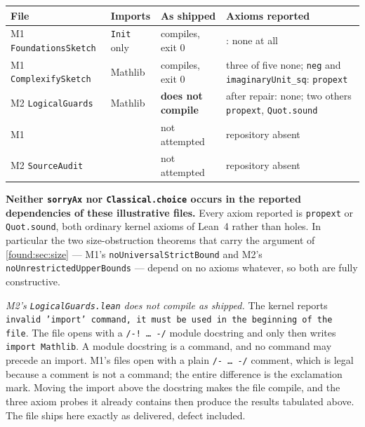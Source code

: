 \documentclass[11pt,letterpaper]{article}
\numberwithin{equation}{section}
\theoremstyle{definition}
\theoremstyle{remark}
\begin{document}
\begin{center}\small
\begin{tabular}{@{}P{0.29\textwidth}P{0.17\textwidth}P{0.20\textwidth}P{0.26\textwidth}@{}}
\toprule
\textbf{File} & \textbf{Imports} & \textbf{As shipped} & \textbf{Axioms reported}\\
\midrule
M1 \texttt{FoundationsSketch} & \texttt{Init} only & compiles, exit 0 &
  : none at all\\[0.35em]
M1 \texttt{ComplexifySketch} & Mathlib & compiles, exit 0 &
  three of five none; \texttt{neg} and \texttt{imaginaryUnit\_sq}:
  \texttt{propext}\\[0.35em]
M2 \texttt{LogicalGuards} & Mathlib & \textbf{does not compile} &
  after repair:  none; two others
  \texttt{propext}, \texttt{Quot.sound}\\[0.35em]
M1  &  & not attempted &
  repository absent\\[0.35em]
M2 \texttt{SourceAudit} &  & not attempted &
  repository absent\\
\bottomrule
\end{tabular}
\end{center}

\textbf{Neither \texttt{sorryAx} nor \texttt{Classical.choice} occurs in the
reported dependencies of these illustrative files.} Every axiom reported is \texttt{propext} or \texttt{Quot.sound}, both ordinary
kernel axioms of Lean~4 rather than holes. In particular the two size-obstruction
theorems that carry the argument of \cref{found:sec:size} --- M1's
\texttt{noUniversalStrictBound} and M2's \texttt{noUnrestrictedUpperBounds} ---
depend on no axioms whatever, so both are fully constructive.

\emph{M2's \texttt{LogicalGuards.lean} does not compile as shipped.} The kernel
reports \texttt{invalid 'import' command, it must be used in the beginning of the
file}. The file opens with a \texttt{/-!\,\ldots\,-/} module docstring and only
then writes \texttt{import Mathlib}. A module docstring is a command, and no
command may precede an import. M1's files open with a plain
\texttt{/-\,\ldots\,-/} comment, which is legal because a comment is not a
command; the entire difference is the exclamation mark. Moving the import above
the docstring makes the file compile, and the three axiom probes it already
contains then produce the results tabulated above. The file ships here exactly as
delivered, defect included.
\end{document}
